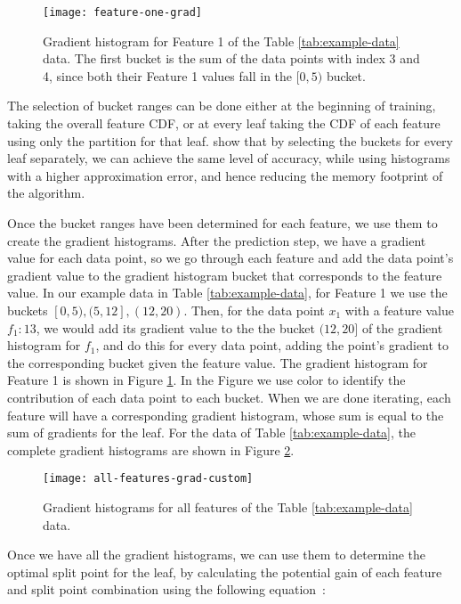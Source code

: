 \begin{figure}
	\centering
	\texttt{[image: feature-one-grad]}
	\caption{Gradient histogram for Feature 1 of the Table \ref{tab:example-data} data.
	The first bucket is the sum of the data points with index 3 and 4, since both their Feature 1
	values fall in the $[0, 5)$ bucket.}
	\label{fig:gradient-feature-one}
\end{figure}


The selection of bucket ranges can be done either at the beginning of training, taking the
overall feature CDF, or at every leaf taking the CDF of each feature using only the
partition for that leaf. \citet{xgboost} show that by selecting the buckets for every
leaf separately, we can achieve the same level of accuracy, while using histograms with a higher approximation error, and hence reducing the memory footprint of the algorithm.


Once the bucket ranges have been determined for each feature, we use them to create
the gradient histograms. After the prediction step, we have a gradient value for each data point, so
we go through each feature and add the data point's gradient value to the gradient
histogram bucket
that corresponds to the feature value.
In our example data in Table \ref{tab:example-data}, for Feature 1 we use the
buckets $[0, 5), (5, 12], (12, 20)$.
Then, for the data point $x_1$ with a feature value $f_1 : 13$, we would add its
gradient value to the
the bucket $(12, 20]$ of the gradient histogram for $f_1$, and do this for
every data point, adding the point's gradient to the corresponding bucket given
the feature value. The gradient histogram for Feature 1 is shown in Figure \ref{fig:gradient-feature-one}. In the Figure we use color to identify the
contribution of each data point to each bucket.
When we are done iterating, each feature will have a corresponding gradient histogram,
whose sum is equal to the sum of gradients for the leaf.
For the data of Table \ref{tab:example-data}, the complete gradient histograms
are shown in Figure \ref{fig:gradient-all-features}.

\begin{figure}
	\centering
	\texttt{[image: all-features-grad-custom]}
	\caption{Gradient histograms for all features of the Table \ref{tab:example-data} data.
		}
	\label{fig:gradient-all-features}
\end{figure}

Once we have all the gradient histograms, we can use them to determine the optimal split point for the
leaf, by calculating the potential gain of each feature and split point combination using the following equation~\cite{xgboost}:

